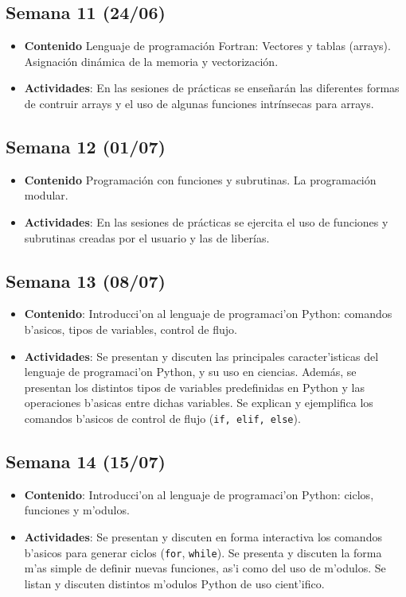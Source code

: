 \documentclass[letterpaper,11pt]{exam}
\begin{document}
\begin{multicols}{2}
\begin{scriptsize}
\subsection*{Semana 11 (24/06)}
\begin{itemize}
\item \textbf{Contenido} Lenguaje de programación Fortran: Vectores y tablas (arrays). Asignación dinámica de la memoria y vectorización.
\item \textbf{Actividades}: En las sesiones de prácticas se enseñarán las diferentes formas de contruir arrays y el uso de algunas funciones intrínsecas para arrays.
\end{itemize}

\subsection*{Semana 12 (01/07)}
\begin{itemize}
\item \textbf{Contenido} Programación con funciones y subrutinas. La programación modular.  
\item \textbf{Actividades}: En las sesiones de prácticas se ejercita el uso de funciones y subrutinas creadas por el usuario y las de liberías.
\end{itemize}



\subsection*{Semana 13 (08/07)}
\begin{itemize}
\item \textbf{Contenido}: Introducci'on al lenguaje de programaci'on Python: comandos b'asicos, tipos de variables, control de flujo.
\item \textbf{Actividades}: Se presentan y discuten las principales caracter'isticas del lenguaje de programaci'on Python, y su uso en ciencias. Además, se presentan los distintos tipos de variables predefinidas en Python y las operaciones b'asicas entre dichas variables. Se explican y ejemplifica los comandos b'asicos de control de flujo (\texttt{if, elif, else}).
\end{itemize}

\subsection*{Semana 14 (15/07)}
\begin{itemize}
\item \textbf{Contenido}: Introducci'on al lenguaje de programaci'on Python: ciclos, funciones y m'odulos.
\item \textbf{Actividades}: Se presentan y discuten en forma interactiva los comandos b'asicos para generar ciclos (\texttt{for}, \texttt{while}). Se presenta y discuten la forma m'as simple de definir nuevas funciones, as'i como del uso de m'odulos. Se listan y discuten distintos m'odulos Python de uso cient'ifico.
\end{itemize}


\end{scriptsize}
\end{multicols}
\end{document}
